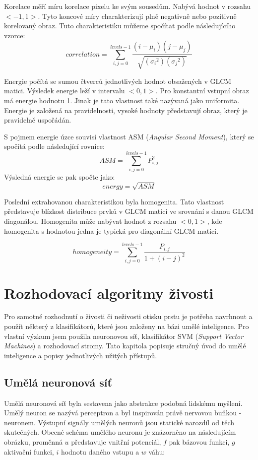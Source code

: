 Korelace měří míru korelace pixelu ke svým sousedům. Nabývá hodnot v rozsahu $<-1, 1>$. Tyto koncové míry charakterizují plně negativně nebo pozitivně korelovaný obraz. \cite{MatlabGLCM} Tuto charakteristiku můžeme spočítat podle následujícího vzorce: \cite{ScikitGLCM}
$$correlation = \sum_{i,j=0}^{levels-1}\frac{(i-\mu_i)(j-\mu_j)}{\sqrt{({\sigma_i}^2)({\sigma_j}^2)}}$$

Energie počítá se sumou čtverců jednotlivých hodnot obsažených v GLCM matici. Výsledek energie leží v intervalu $<0, 1>$. Pro konstantní vstupní obraz má energie hodnotu 1. Jinak je tato vlastnost také nazývaná jako uniformita. Energie je založená na pravidelnosti, vysoké hodnoty představují obraz, který je pravidelně uspořádán. \cite{MatlabGLCM}

S pojmem energie úzce souvisí vlastnost ASM (\textit{Angular Second Moment}), který se spočítá podle následující rovnice: \cite{ScikitGLCM}
$$ASM = \sum_{i,j=0}^{levels-1}P_{i,j}^2$$
\noindent
Výsledná energie se pak spočte jako: \cite{ScikitGLCM}
$$energy = \sqrt{ASM}$$

Poslední extrahovanou charakteristikou byla homogenita. Tato vlastnost představuje blízkost distribuce prvků v GLCM matici ve srovnání s danou GLCM diagonálou. Homogenita může nabývat hodnot z rozsahu $<0, 1>$, kde homogenita s hodnotou jedna je typická pro diagonální GLCM matici. \cite{MatlabGLCM} \cite{ScikitGLCM}

$$homogeneity = \sum_{i,j=0}^{levels-1}\frac{P_{i,j}}{1+(i-j)^2}$$


\chapter{Rozhodovací algoritmy živosti}
Pro samotné rozhodnutí o živosti či neživosti otisku prstu je potřeba navrhnout a použít některý z klasifikátorů, které jsou založeny na bázi umělé inteligence. Pro vlastní výzkum jsem použila neuronovou síť, klasifikátor SVM (\textit{Support Vector Machines}) a rozhodovací stromy. Tato kapitola popisuje stručný úvod do umělé inteligence a popisy jednotlivých užitých přístupů.

\section{Umělá neuronová síť}
Umělá neuronová síť byla sestavena jako abstrakce podobná lidskému myšlení. Umělý neuron se nazývá perceptron a byl inspirován právě nervovou buňkou - neuronem. Výstupní signály umělých neuronů jsou statické narozdíl od těch skutečných. Obecné schéma umělého neuronu je znázorněno na následujícím obrázku, proměnná $u$ představuje vnitřní potenciál, $f$ pak bázovou funkci, $g$ aktivační funkci, $i$ hodnotu daného vstupu a $w$ váhu:

